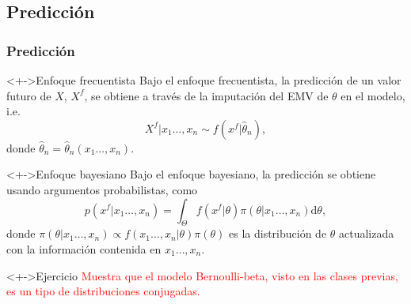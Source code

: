\documentclass[cjk,t,compress]{beamer}
\newcommand{\dd}{\mathrm{d}}
\begin{document}
	\subsection{Predicci\'on}
	\frame
	{
    \frametitle{Predicci\'on}
  		{\scriptsize  	
		
		\begin{block}<+->{Enfoque frecuentista}
	  	{
	  	Bajo el enfoque frecuentista, la predicci\'on de un valor futuro de $X$, $X^f$, se obtiene a trav\'es de la imputaci\'on del EMV de $\theta$ en el modelo, i.e.
	  	\begin{equation}
	  		X^f|x_1\ldots,x_n \sim f(x^f|\widehat{\theta}_n),
	  	\end{equation}
	  	donde $\widehat{\theta}_n=\widehat{\theta}_n(x_1\ldots,x_n)$.
	  	}
 		\end{block}  		

	  	\vspace{0.3cm}
		\begin{block}<+->{Enfoque bayesiano}
	  	{
	  	Bajo el enfoque bayesiano, la predicci\'on se obtiene usando argumentos probabilistas, como
	  	\begin{equation}
	  		p(x^f|x_1\ldots,x_n) = \int_{\Theta} f(x^f|\theta) \pi(\theta|x_1\ldots,x_n)\dd \theta,
	  	\end{equation}
	  	donde $\pi(\theta|x_1\ldots,x_n) \propto f(x_1\ldots,x_n|\theta)\pi(\theta)$ es la distribuci\'on de $\theta$ actualizada con la informaci\'on contenida en $x_1\ldots,x_n$.
	  	}
 		\end{block}  		

	  	\vspace{0.3cm}
		\begin{block}<+->{Ejercicio}
	  	{
	  	\textcolor{red}{Muestra que el modelo Bernoulli-beta, visto en las clases previas, es un tipo de distribuciones conjugadas.}
	  	}
 		\end{block}  		

		}
	}

\end{document}
